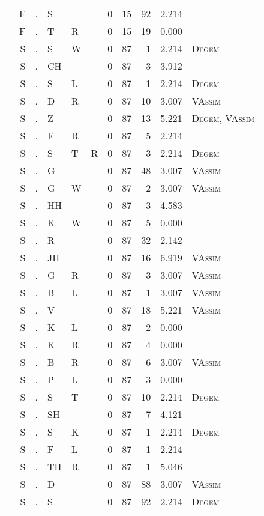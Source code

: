 \begin{longtable}{r@{ } r@{ } c@{ } l@{ } l@{ } l@{ } r r r r l }
 & F & . & S &  &  & 0 & 15 & 92 & 2.214 &  \\
 & F & . & T & R &  & 0 & 15 & 19 & 0.000 &  \\
 & S & . & S & W &  & 0 & 87 & 1 & 2.214 & \textsc{Degem} \\
 & S & . & CH &  &  & 0 & 87 & 3 & 3.912 &  \\
 & S & . & S & L &  & 0 & 87 & 1 & 2.214 & \textsc{Degem} \\
 & S & . & D & R &  & 0 & 87 & 10 & 3.007 & \textsc{VAssim} \\
 & S & . & Z &  &  & 0 & 87 & 13 & 5.221 & \textsc{Degem}, \textsc{VAssim} \\
 & S & . & F & R &  & 0 & 87 & 5 & 2.214 &  \\
 & S & . & S & T & R & 0 & 87 & 3 & 2.214 & \textsc{Degem} \\
 & S & . & G &  &  & 0 & 87 & 48 & 3.007 & \textsc{VAssim} \\
 & S & . & G & W &  & 0 & 87 & 2 & 3.007 & \textsc{VAssim} \\
 & S & . & HH &  &  & 0 & 87 & 3 & 4.583 &  \\
 & S & . & K & W &  & 0 & 87 & 5 & 0.000 &  \\
 & S & . & R &  &  & 0 & 87 & 32 & 2.142 &  \\
 & S & . & JH &  &  & 0 & 87 & 16 & 6.919 & \textsc{VAssim} \\
 & S & . & G & R &  & 0 & 87 & 3 & 3.007 & \textsc{VAssim} \\
 & S & . & B & L &  & 0 & 87 & 1 & 3.007 & \textsc{VAssim} \\
 & S & . & V &  &  & 0 & 87 & 18 & 5.221 & \textsc{VAssim} \\
 & S & . & K & L &  & 0 & 87 & 2 & 0.000 &  \\
 & S & . & K & R &  & 0 & 87 & 4 & 0.000 &  \\
 & S & . & B & R &  & 0 & 87 & 6 & 3.007 & \textsc{VAssim} \\
 & S & . & P & L &  & 0 & 87 & 3 & 0.000 &  \\
 & S & . & S & T &  & 0 & 87 & 10 & 2.214 & \textsc{Degem} \\
 & S & . & SH &  &  & 0 & 87 & 7 & 4.121 &  \\
 & S & . & S & K &  & 0 & 87 & 1 & 2.214 & \textsc{Degem} \\
 & S & . & F & L &  & 0 & 87 & 1 & 2.214 &  \\
 & S & . & TH & R &  & 0 & 87 & 1 & 5.046 &  \\
 & S & . & D &  &  & 0 & 87 & 88 & 3.007 & \textsc{VAssim} \\
 & S & . & S &  &  & 0 & 87 & 92 & 2.214 & \textsc{Degem} \\
\bottomrule
\end{longtable}
